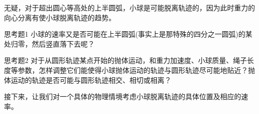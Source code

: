 无疑，对于超出圆心等高处的上半圆弧，小球是可能脱离轨迹的，因为此时重力的向心分离有使小球脱离轨迹的趋势。

\begin{exercise}{思考题1}
小球的速率又是否可能在上半圆弧(事实上是那特殊的四分之一圆弧)的某处归零，然后竖直落下去呢？
\end{exercise}

\begin{exercise}{思考题2}
对于从圆形轨迹某点开始的抛体运动，和重力加速度、小球质量、绳子长度等参数，怎样调整它们能使得小球抛体运动的轨迹与圆形轨迹尽可能地贴近？抛体运动的轨迹是否可能与圆形轨迹相交、相切或相离？
\end{exercise}

接下来，让我们对一个具体的物理情境考虑小球脱离轨迹的具体位置及相应的速率。